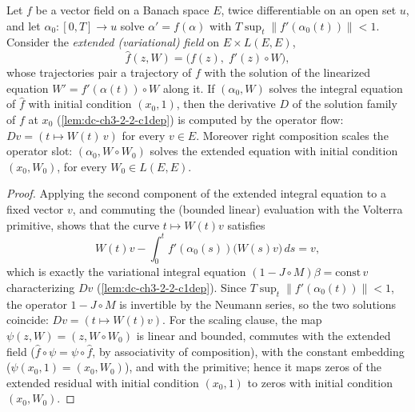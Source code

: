 \begin{lemma}
  \label{lem:dc-ch3-2-2-variational}


  Let $f$ be a vector field on a Banach space $E$, twice differentiable on an
  open set $u$, and let $\alpha_0 : [0,T] \to u$ solve $\alpha' = f(\alpha)$
  with $T \sup_t \|f'(\alpha_0(t))\| < 1$. Consider the \emph{extended
  (variational) field} on $E \times L(E,E)$,
  $$\hat f(z, W) = \big(f(z),\; f'(z) \circ W\big),$$
  whose trajectories pair a trajectory of $f$ with the solution of the
  linearized equation $W' = f'(\alpha(t)) \circ W$ along it. If $(\alpha_0, W)$
  solves the integral equation of $\hat f$ with initial condition $(x_0, 1)$,
  then the derivative $D$ of the solution family of $f$ at $x_0$
  (\cref{lem:dc-ch3-2-2-c1dep}) is computed by the operator flow:
  $Dv = (t \mapsto W(t)\,v)$ for every $v \in E$. Moreover right composition
  scales the operator slot: $(\alpha_0, W \circ W_0)$ solves the extended
  equation with initial condition $(x_0, W_0)$, for every $W_0 \in L(E,E)$.
\end{lemma}
\begin{proof}
  \sketch

  Applying the second component of the extended integral equation to a fixed
  vector $v$, and commuting the (bounded linear) evaluation with the Volterra
  primitive, shows that the curve $t \mapsto W(t)v$ satisfies
  $$W(t)v - \int_0^t f'(\alpha_0(s))\big(W(s)v\big)\,ds = v ,$$
  which is exactly the variational integral equation
  $(1 - J \circ M)\beta = \mathrm{const}\, v$ characterizing $Dv$
  (\cref{lem:dc-ch3-2-2-c1dep}). Since $T \sup_t \|f'(\alpha_0(t))\| < 1$, the
  operator $1 - J \circ M$ is invertible by the Neumann series, so the two
  solutions coincide: $Dv = (t \mapsto W(t)v)$. For the scaling clause, the map
  $\psi(z, W) = (z, W \circ W_0)$ is linear and bounded, commutes with the
  extended field ($\hat f \circ \psi = \psi \circ \hat f$, by associativity of
  composition), with the constant embedding ($\psi(x_0, 1) = (x_0, W_0)$), and
  with the primitive; hence it maps zeros of the extended residual with initial
  condition $(x_0, 1)$ to zeros with initial condition $(x_0, W_0)$.
\end{proof}

